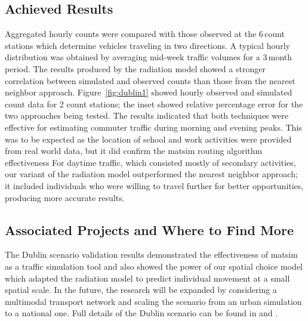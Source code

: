 \subsection{Achieved Results}
Aggregated hourly counts were compared with those observed at the 6\,count stations which determine vehicles traveling in two directions. A typical hourly distribution was obtained by averaging mid-week traffic volumes for a 3\,month period. The results produced by the radiation model showed a stronger correlation between simulated and observed counts than those from the nearest neighbor approach. Figure~\ref{fig:dublin1} showed hourly observed and simulated count data for 2 count stations; the inset showed relative percentage error for the two approaches being tested. The results indicated that both techniques were effective for estimating commuter traffic during morning and evening peaks. This was to be expected as the location of school and work activities were provided from real world data, but it did confirm the \gls{matsim} routing algorithm effectiveness For daytime traffic, which consisted mostly of secondary activities, our variant of the radiation model outperformed the nearest neighbor approach; it included individuals who were willing to travel further for better opportunities, producing more accurate results.

\subsection{Associated Projects and Where to Find More}
The Dublin scenario validation results demonstrated the effectiveness of \gls{matsim} as a traffic simulation tool and also showed the power of our spatial choice model which adapted the radiation model to predict individual movement at a small spatial scale. In the future, the research will be expanded by considering a \gls{multimodal} transport network and scaling the scenario from an urban simulation to a national one. Full details of the Dublin scenario can be found in \citet[][]{McArdleEtAl_IWUC_2012} and \citet[][]{McArdleEtAl_ACMTIS_2014}.

